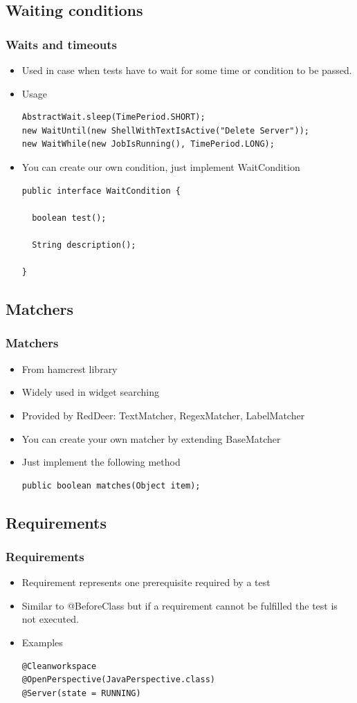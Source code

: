 \documentclass{beamer}
\begin{document}
\subsection{Waiting conditions}
\begin{frame}[fragile]
\frametitle{Waits and timeouts}
\begin{itemize}
\item Used in case when tests have to wait for some time or condition to be passed.
\item Usage
\begin{lstlisting}
AbstractWait.sleep(TimePeriod.SHORT);
new WaitUntil(new ShellWithTextIsActive("Delete Server"));
new WaitWhile(new JobIsRunning(), TimePeriod.LONG);
\end{lstlisting}
\item You can create our own condition, just implement WaitCondition
\begin{lstlisting}
public interface WaitCondition {

  boolean test();

  String description();

}
\end{lstlisting}
\end{itemize}
\end{frame}

\subsection{Matchers}
\begin{frame}[fragile]
\frametitle{Matchers}
\begin{itemize}
\item From hamcrest library
\item Widely used in widget searching
\item Provided by RedDeer: TextMatcher, RegexMatcher, LabelMatcher
\item You can create your own matcher by extending BaseMatcher
\item Just implement the following method
\begin{lstlisting}
public boolean matches(Object item);
\end{lstlisting}
\end{itemize}
\end{frame}

\subsection{Requirements}
\begin{frame}[fragile]
\frametitle{Requirements}
\begin{itemize}
\item Requirement represents one prerequisite required by a test
\item Similar to @BeforeClass but if a requirement cannot be fulfilled the test is not executed.
\item Examples
\begin{lstlisting}
@Cleanworkspace 
@OpenPerspective(JavaPerspective.class)
@Server(state = RUNNING)
\end{lstlisting}
\end{itemize}
\end{frame}
\end{document}
